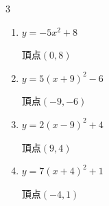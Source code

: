 \begin{multicols}{3}
\begin{enumerate}
  \item $\displaystyle y=-5x^{2}+8$

        $\displaystyle 頂点\left( 0 , 8 \right)$

  \item $\displaystyle y=5\left( x+9\right)^{2}-6$

        $\displaystyle 頂点\left( -9 , -6 \right)$

  \item $\displaystyle y=2\left( x-9\right)^{2}+4$

        $\displaystyle 頂点\left( 9 , 4 \right)$

  \item $\displaystyle y=7\left( x+4\right)^{2}+1$

        $\displaystyle 頂点\left( -4 , 1 \right)$

\end{enumerate}
\end{multicols}
